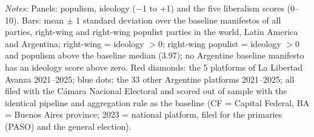 \par\smallskip\begin{minipage}{\linewidth}\scriptsize\textit{Notes:} Panels: populism, ideology ($-$1 to +1) and the five liberalism scores (0--10). Bars: mean $\pm$ 1 standard deviation over the baseline manifestos of all parties, right-wing and right-wing populist parties in the world, Latin America and Argentina; right-wing = ideology $> 0$; right-wing populist = ideology $> 0$ and populism above the baseline median (3.97); no Argentine baseline manifesto has an ideology score above zero. Red diamonds: the 5 platforms of La Libertad Avanza 2021--2025; blue dots: the 33 other Argentine platforms 2021--2025; all filed with the C\'amara Nacional Electoral and scored out of sample with the identical pipeline and aggregation rule as the baseline (CF = Capital Federal, BA = Buenos Aires province; 2023 = national platform, filed for the primaries (PASO) and the general election).\end{minipage}
